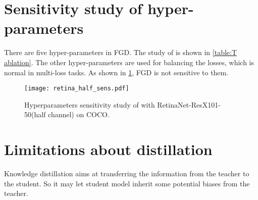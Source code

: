\documentclass[10pt,twocolumn,letterpaper]{article}
\begin{document}
\section{Sensitivity study of hyper-parameters}
There are five hyper-parameters in FGD. The study of  is shown in \cref{table:T ablation}. The other hyper-parameters  are used for balancing the losses, which is normal in multi-loss tasks. As shown in \cref{figure:sens}, FGD is not sensitive to them.

\begin{figure}
  \centering
  \texttt{[image: retina\_half\_sens.pdf]}
  \caption{Hyperparameters sensitivity study of  with RetinaNet-ResX101-50(half channel) on COCO.}
  \label{figure:sens}
\end{figure}

\section{Limitations about distillation}
Knowledge distillation aims at transferring the information from the teacher to the student. So it may let student model inherit some potential biases from the teacher.
\end{document}
